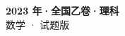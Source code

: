 \documentclass[zihao=-4, a4paper]{ctexart}
\begin{document}
\begin{center}
  {\Large\bfseries 2023 年·全国乙卷·理科}\\[4pt]
  {\large 数学 · 试题版}
\end{center}
\medskip
{}

\end{document}
